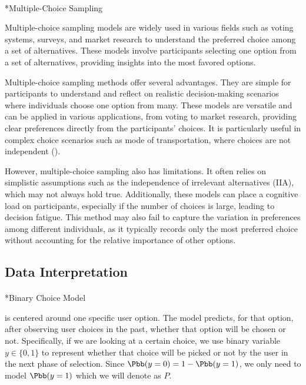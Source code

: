 \documentclass[
  letterpaper,
  DIV=11,
  numbers=noendperiod,
  oneside]{scrreprt}
\makeatletter
\let\oldparagraph\paragraph
\renewcommand{\paragraph}{
    \@ifstar
      \xxxParagraphStar
      \xxxParagraphNoStar
  }
\newcommand{\xxxParagraphStar}[1]{\oldparagraph*{#1}\mbox{}}
\newcommand{\xxxParagraphNoStar}[1]{\oldparagraph{#1}\mbox{}}
\theoremstyle{remark}
\makeatother
\begin{document}
\paragraph*{Multiple-Choice Sampling}\label{multiple-choice-sampling}

Multiple-choice sampling models are widely used in various fields such
as voting systems, surveys, and market research to understand the
preferred choice among a set of alternatives. These models involve
participants selecting one option from a set of alternatives, providing
insights into the most favored options.

Multiple-choice sampling methods offer several advantages. They are
simple for participants to understand and reflect on realistic
decision-making scenarios where individuals choose one option from many.
These models are versatile and can be applied in various applications,
from voting to market research, providing clear preferences directly
from the participants' choices. It is particularly useful in complex
choice scenarios such as mode of transportation, where choices are not
independent ().

However, multiple-choice sampling also has limitations. It often relies
on simplistic assumptions such as the independence of irrelevant
alternatives (IIA), which may not always hold true. Additionally, these
models can place a cognitive load on participants, especially if the
number of choices is large, leading to decision fatigue. This method may
also fail to capture the variation in preferences among different
individuals, as it typically records only the most preferred choice
without accounting for the relative importance of other options.

\subsection{Data Interpretation}\label{data-interpretation}

\paragraph*{Binary Choice Model}\label{binary-choice-model}

is centered around one specific user option. The model predicts, for
that option, after observing user choices in the past, whether that
option will be chosen or not. Specifically, if we are looking at a
certain choice, we use binary variable \(y \in \{0, 1\}\) to represent
whether that choice will be picked or not by the user in the next phase
of selection. Since \(\Pbb(y = 0) = 1 - \Pbb(y = 1)\), we only need to
model \(\Pbb(y = 1)\) which we will denote as \(P\).
\end{document}
